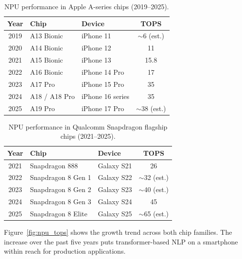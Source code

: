 \begin{table}[h]
\centering
\caption{NPU performance in Apple A-series chips (2019--2025).}
\label{tab:apple_npu}
\begin{tabular}{|c|l|l|c|}
\hline
\textbf{Year} & \textbf{Chip} & \textbf{Device} & \textbf{TOPS} \\
\hline
2019 & A13 Bionic   & iPhone 11        & $\sim$6 (est.) \\
2020 & A14 Bionic   & iPhone 12        & 11 \\
2021 & A15 Bionic   & iPhone 13        & 15.8 \\
2022 & A16 Bionic   & iPhone 14 Pro    & 17 \\
2023 & A17 Pro      & iPhone 15 Pro    & 35 \\
2024 & A18 / A18 Pro & iPhone 16 series & 35 \\
2025 & A19 Pro      & iPhone 17 Pro    & $\sim$38 (est.) \\
\hline
\end{tabular}
\end{table}

\begin{table}[h]
\centering
\caption{NPU performance in Qualcomm Snapdragon flagship chips (2021--2025).}
\label{tab:qualcomm_npu}
\begin{tabular}{|c|l|l|c|}
\hline
\textbf{Year} & \textbf{Chip} & \textbf{Device} & \textbf{TOPS} \\
\hline
2021 & Snapdragon 888    & Galaxy S21 & 26 \\
2022 & Snapdragon 8 Gen 1 & Galaxy S22 & $\sim$32 (est.) \\
2023 & Snapdragon 8 Gen 2 & Galaxy S23 & $\sim$40 (est.) \\
2024 & Snapdragon 8 Gen 3 & Galaxy S24 & 45 \\
2025 & Snapdragon 8 Elite & Galaxy S25 & $\sim$65 (est.) \\
\hline
\end{tabular}
\end{table}

Figure~\ref{fig:npu_tops} shows the growth trend across both chip families. The increase over the past five years puts transformer-based NLP on a smartphone within reach for production applications.

